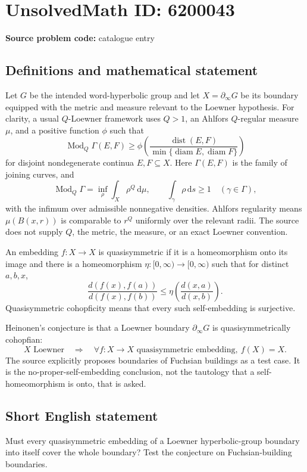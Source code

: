 \documentclass[11pt]{article}
\begin{document}
\section*{UnsolvedMath ID: 6200043}
\textbf{Source problem code:} catalogue entry
\subsection{Definitions and mathematical statement}
Let $G$ be the intended word-hyperbolic group and let $X=\partial_\infty G$ be its boundary equipped with the metric and measure relevant to the Loewner hypothesis. For clarity, a usual $Q$-Loewner framework uses $Q>1$, an Ahlfors $Q$-regular measure $\mu$, and a positive function $\phi$ such that
\[
 \operatorname{Mod}_Q\Gamma(E,F)\ge
 \phi\!\left(\frac{\operatorname{dist}(E,F)}
                    {\min\{\operatorname{diam}E,\operatorname{diam}F\}}\right)
\]
for disjoint nondegenerate continua $E,F\subseteq X$. Here $\Gamma(E,F)$ is the family of joining curves, and
\[
 \operatorname{Mod}_Q\Gamma=\inf_\rho\int_X\rho^Q\,\mathrm d\mu,
 \qquad\int_\gamma\rho\,\mathrm ds\ge1\quad(\gamma\in\Gamma),
\]
with the infimum over admissible nonnegative densities. Ahlfors regularity means $\mu(B(x,r))$ is comparable to $r^Q$ uniformly over the relevant radii. The source does not supply $Q$, the metric, the measure, or an exact Loewner convention.

An embedding $f:X\to X$ is quasisymmetric if it is a homeomorphism onto its image and there is a homeomorphism $\eta:[0,\infty)\to[0,\infty)$ such that for distinct $a,b,x$,
\[
 \frac{d(f(x),f(a))}{d(f(x),f(b))}
       \le\eta\!\left(\frac{d(x,a)}{d(x,b)}\right).
\]
Quasisymmetric cohopficity means that every such self-embedding is surjective.

Heinonen's conjecture is that a Loewner boundary $\partial_\infty G$ is quasisymmetrically cohopfian:
\[
 X\text{ Loewner}\quad\Longrightarrow\quad
 \forall f:X\to X\text{ quasisymmetric embedding},\ f(X)=X.
\]
The source explicitly proposes boundaries of Fuchsian buildings as a test case. It is the no-proper-self-embedding conclusion, not the tautology that a self-homeomorphism is onto, that is asked.
\subsection{Short English statement}
Must every quasisymmetric embedding of a Loewner hyperbolic-group boundary into itself cover the whole boundary? Test the conjecture on Fuchsian-building boundaries.
\end{document}
